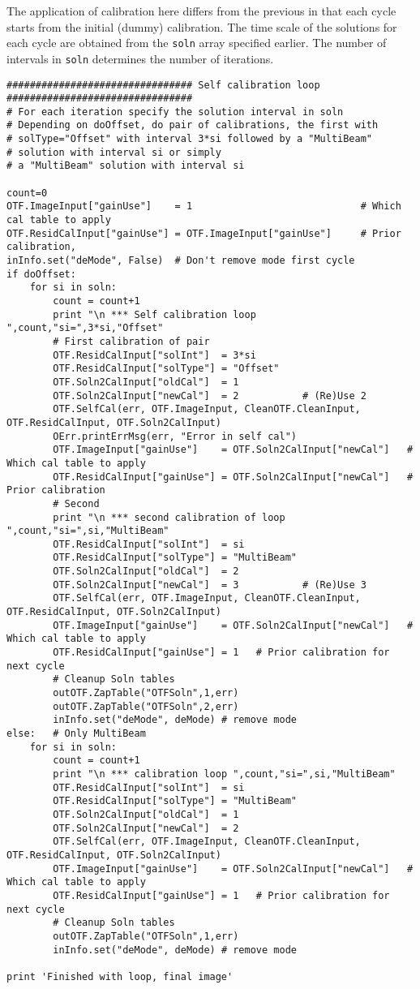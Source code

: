 \documentclass[11pt]{report}
\begin{document}
The application of calibration here differs from the previous in that
each cycle starts from the initial (dummy) calibration.
The time scale of the solutions for each cycle are obtained from the
{\tt soln} array specified earlier. 
The number of intervals in {\tt soln} determines the number of iterations.
\begin{verbatim}
################################ Self calibration loop ################################
# For each iteration specify the solution interval in soln
# Depending on doOffset, do pair of calibrations, the first with
# solType="Offset" with interval 3*si followed by a "MultiBeam"
# solution with interval si or simply 
# a "MultiBeam" solution with interval si

count=0
OTF.ImageInput["gainUse"]    = 1                             # Which cal table to apply
OTF.ResidCalInput["gainUse"] = OTF.ImageInput["gainUse"]     # Prior calibration,
inInfo.set("deMode", False)  # Don't remove mode first cycle
if doOffset:
    for si in soln:
        count = count+1
        print "\n *** Self calibration loop ",count,"si=",3*si,"Offset"
        # First calibration of pair
        OTF.ResidCalInput["solInt"]  = 3*si
        OTF.ResidCalInput["solType"] = "Offset"
        OTF.Soln2CalInput["oldCal"]  = 1
        OTF.Soln2CalInput["newCal"]  = 2           # (Re)Use 2
        OTF.SelfCal(err, OTF.ImageInput, CleanOTF.CleanInput, OTF.ResidCalInput, OTF.Soln2CalInput)
        OErr.printErrMsg(err, "Error in self cal")
        OTF.ImageInput["gainUse"]    = OTF.Soln2CalInput["newCal"]   # Which cal table to apply
        OTF.ResidCalInput["gainUse"] = OTF.Soln2CalInput["newCal"]   # Prior calibration
        # Second
        print "\n *** second calibration of loop ",count,"si=",si,"MultiBeam"
        OTF.ResidCalInput["solInt"]  = si
        OTF.ResidCalInput["solType"] = "MultiBeam"
        OTF.Soln2CalInput["oldCal"]  = 2
        OTF.Soln2CalInput["newCal"]  = 3           # (Re)Use 3
        OTF.SelfCal(err, OTF.ImageInput, CleanOTF.CleanInput, OTF.ResidCalInput, OTF.Soln2CalInput)
        OTF.ImageInput["gainUse"]    = OTF.Soln2CalInput["newCal"]   # Which cal table to apply
        OTF.ResidCalInput["gainUse"] = 1   # Prior calibration for next cycle
        # Cleanup Soln tables
        outOTF.ZapTable("OTFSoln",1,err)
        outOTF.ZapTable("OTFSoln",2,err)
        inInfo.set("deMode", deMode) # remove mode
else:   # Only MultiBeam
    for si in soln:
        count = count+1
        print "\n *** calibration loop ",count,"si=",si,"MultiBeam"
        OTF.ResidCalInput["solInt"]  = si
        OTF.ResidCalInput["solType"] = "MultiBeam"
        OTF.Soln2CalInput["oldCal"]  = 1
        OTF.Soln2CalInput["newCal"]  = 2
        OTF.SelfCal(err, OTF.ImageInput, CleanOTF.CleanInput, OTF.ResidCalInput, OTF.Soln2CalInput)
        OTF.ImageInput["gainUse"]    = OTF.Soln2CalInput["newCal"]   # Which cal table to apply
        OTF.ResidCalInput["gainUse"] = 1   # Prior calibration for next cycle
        # Cleanup Soln tables
        outOTF.ZapTable("OTFSoln",1,err)
        inInfo.set("deMode", deMode) # remove mode

print 'Finished with loop, final image'
\end{verbatim}
\end{document}
